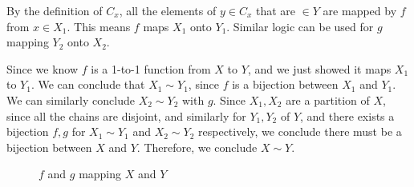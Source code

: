 {{\item By the definition of $C_x$, all the elements of $y \in C_x$ that are $\in Y$
are mapped by $f$ from $x \in X_1$. This means $f$ maps $X_1$ onto $Y_1$. Similar logic can
be used for $g$ mapping $Y_2$ onto $X_2$.

Since we know $f$ is a 1-to-1 function from $X$ to $Y$, and we just showed it maps $X_1$ to $Y_1$.
We can conclude that $X_1 \sim Y_1$, since $f$ is a bijection between $X_1$ and $Y_1$.
We can similarly conclude $X_2 \sim Y_2$ with $g$.
Since $X_1, X_2$ are a partition of $X$, since all the chains are disjoint, and similarly for $Y_1, Y_2$ of $Y$, and there exists a bijection
$f, g$ for $X_1 \sim Y_1$ and $X_2 \sim Y_2$ respectively, we conclude there must be a bijection between $X$ and $Y$.
Therefore, we conclude $X \sim Y$.

\begin{figure}[H]
	\centering
	\def\ellipseX{1}
	\def\ellipseY{2}
	\caption{$f$ and $g$ mapping $X$ and $Y$}
	\label{fig:problem_1_4_13_bijection}
\end{figure}
}
}
